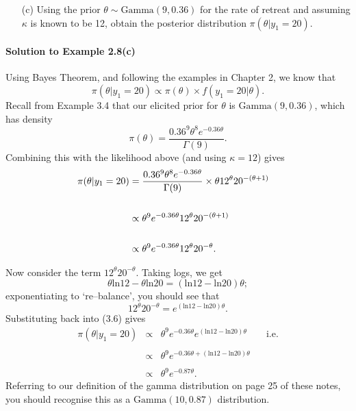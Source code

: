 {{    
}

\clearpage

\begin{itemize}
\item [(c)] Using the prior $\theta \sim \text{Gamma}(9,0.36)$ for the rate of retreat and assuming $\kappa$ is known to be 12, obtain the posterior distribution $\pi(\theta|y_{1}=20)$.  
\end{itemize}

\paragraph{Solution to Example 2.8(c)}{
    
        Using Bayes Theorem, and following the examples in Chapter 2, we know that
        $$
        \pi(\theta|y_{1}=20) \propto \pi(\theta)\times f(y_1 =20 | \theta).
        $$
        Recall from Example 3.4 that our elicited prior for $\theta$ is $\text{Gamma}(9,0.36)$, which has density
        $$
        \pi(\theta) = \frac{0.36^{9}\theta^{8}e^{-0.36\theta}}{\Gamma(9)}.
        $$
        Combining this with the likelihood above (and using $\kappa=12$) gives
        \begin{align}
        \pi(\theta|y_{1}=20)   &= \frac{0.36^{9}\theta^{8}e^{-0.36\theta}}{\Gamma(9)} \times \theta 12^{\theta}20^{-(\theta+1)} \notag \\
           &  \notag \\
                               &\propto \theta^{9} e^{-0.36 \theta} 12^{\theta} 20^{-(\theta+1)}  \notag \\
            & &\notag   \\
                               &\propto \theta^{9}e^{-0.36 \theta}12^{\theta} 20^{-\theta}.
        \end{align}
        
        Now consider the term $12^{\theta}20^{-\theta}$. Taking logs, we get
        $$
        \theta \text{ln}12 - \theta \text{ln}20  = (\text{ln}12 - \text{ln}20)\theta;
        $$
        exponentiating to `re--balance', you should see that 
        $$
        12^{\theta}20^{-\theta} = e^{(\text{ln}12 - \text{ln}20)\theta}.
        $$
        Substituting back into (3.6) gives
        \begin{eqnarray*}
          \pi(\theta|y_{1}=20)  &\propto& \theta^{9}e^{-0.36 \theta} e^{(\text{ln}12 - \text{ln}20)\theta}     \qquad \text{i.e.}     \\
                   & & \\
                                &\propto& \theta^{9}e^{-0.36\theta +(\text{ln}12-\text{ln}20)\theta}    \\
                         & & \\
                                &\propto& \theta^{9}e^{-0.87 \theta}.
        \end{eqnarray*}
        Referring to our definition of the gamma distribution on page 25 of these notes, you should recognise this as a $\text{Gamma}(10,0.87)$ distribution.   
        
}}
